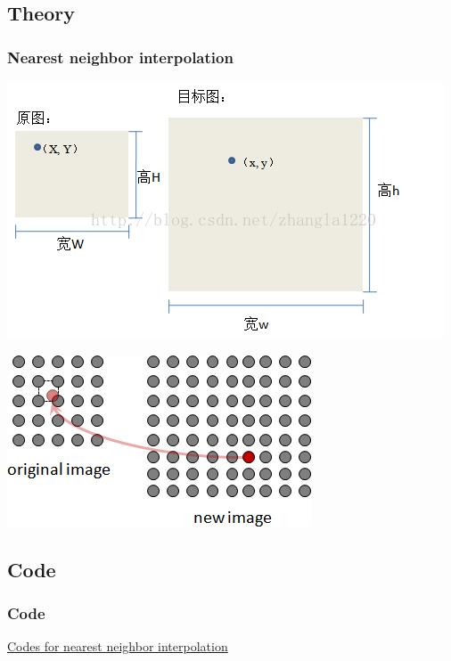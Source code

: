 \documentclass[notheorems,serif,table,compress]{beamer}  %
\begin{document}
\subsection*{Theory}
\begin{frame}
\frametitle{Nearest neighbor interpolation}
    	\begin{minipage}[t]{0.5\linewidth}
        \centering
        \includegraphics[width=1\linewidth]{near.jpg} 
        \end{minipage}
	\begin{minipage}[t]{0.4\linewidth}
        \centering
        \includegraphics[width=1\linewidth]{n.png} 
        \end{minipage}
\end{frame}

\subsection*{Code}
\begin{frame}
\frametitle{Code}
\href{code/nearest.cpp}{Codes for nearest neighbor interpolation}
\end{frame}
\end{document}
